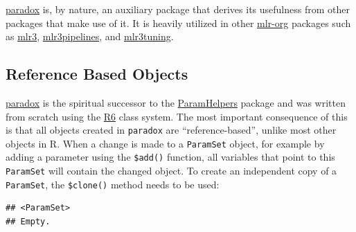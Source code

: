 \documentclass[]{scrbook}
\newenvironment{Shaded}{\begin{snugshade}}{\end{snugshade}}
\newcommand{\CommentTok}[1]{\textcolor[rgb]{0.56,0.35,0.01}{\textit{#1}}}
\newcommand{\DataTypeTok}[1]{\textcolor[rgb]{0.13,0.29,0.53}{#1}}
\newcommand{\KeywordTok}[1]{\textcolor[rgb]{0.13,0.29,0.53}{\textbf{#1}}}
\newcommand{\NormalTok}[1]{#1}
\newcommand{\OperatorTok}[1]{\textcolor[rgb]{0.81,0.36,0.00}{\textbf{#1}}}
\newcommand{\OtherTok}[1]{\textcolor[rgb]{0.56,0.35,0.01}{#1}}
\newcommand{\StringTok}[1]{\textcolor[rgb]{0.31,0.60,0.02}{#1}}
\renewenvironment{Shaded} {\begin{snugshade}\small} {\end{snugshade}}
\begin{document}
\href{https://paradox.mlr-org.com}{paradox} is, by nature, an auxiliary package that derives its usefulness from other packages that make use of it.
It is heavily utilized in other \href{https://github.com/mlr-org}{mlr-org} packages such as \href{https://mlr3.mlr-org.com}{mlr3}, \href{https://mlr3pipelines.mlr-org.com}{mlr3pipelines}, and \href{https://mlr3tuning.mlr-org.com}{mlr3tuning}.

\hypertarget{reference-based-objects}{%
\subsection{Reference Based Objects}\label{reference-based-objects}}

\href{https://paradox.mlr-org.com}{paradox} is the spiritual successor to the \href{https://cran.r-project.org/package=ParamHelpers}{ParamHelpers} package and was written from scratch using the \href{https://cran.r-project.org/package=R6}{R6} class system.
The most important consequence of this is that all objects created in \texttt{paradox} are ``reference-based'', unlike most other objects in R.
When a change is made to a \texttt{ParamSet} object, for example by adding a parameter using the \texttt{\$add()} function, all variables that point to this \texttt{ParamSet} will contain the changed object.
To create an independent copy of a \texttt{ParamSet}, the \texttt{\$clone()} method needs to be used:

\begin{Shaded}
\end{Shaded}

\begin{verbatim}
## <ParamSet>
## Empty.
\end{verbatim}

\begin{Shaded}
\end{Shaded}
\end{document}
